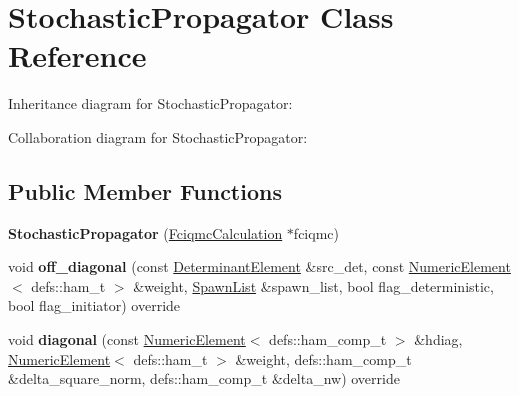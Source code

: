 \hypertarget{classStochasticPropagator}{}\section{Stochastic\+Propagator Class Reference}
\label{classStochasticPropagator}


Inheritance diagram for Stochastic\+Propagator\+:


Collaboration diagram for Stochastic\+Propagator\+:
\subsection*{Public Member Functions}
\begin{DoxyCompactItemize}
\item 
{\bfseries Stochastic\+Propagator} (\hyperlink{classFciqmcCalculation}{Fciqmc\+Calculation} $\ast$fciqmc)\hypertarget{classStochasticPropagator_a8e047b2c7790401fba3ceac809c19c45}{}\label{classStochasticPropagator_a8e047b2c7790401fba3ceac809c19c45}

\item 
void {\bfseries off\+\_\+diagonal} (const \hyperlink{classDeterminantElement}{Determinant\+Element} \&src\+\_\+det, const \hyperlink{classNumericElement}{Numeric\+Element}$<$ defs\+::ham\+\_\+t $>$ \&weight, \hyperlink{structSpawnList}{Spawn\+List} \&spawn\+\_\+list, bool flag\+\_\+deterministic, bool flag\+\_\+initiator) override\hypertarget{classStochasticPropagator_ac6e8058f872699d0960ed6264be2511e}{}\label{classStochasticPropagator_ac6e8058f872699d0960ed6264be2511e}

\item 
void {\bfseries diagonal} (const \hyperlink{classNumericElement}{Numeric\+Element}$<$ defs\+::ham\+\_\+comp\+\_\+t $>$ \&hdiag, \hyperlink{classNumericElement}{Numeric\+Element}$<$ defs\+::ham\+\_\+t $>$ \&weight, defs\+::ham\+\_\+comp\+\_\+t \&delta\+\_\+square\+\_\+norm, defs\+::ham\+\_\+comp\+\_\+t \&delta\+\_\+nw) override\hypertarget{classStochasticPropagator_a358272ef0caf2f43520dbbcacca0dbf1}{}\label{classStochasticPropagator_a358272ef0caf2f43520dbbcacca0dbf1}

\end{DoxyCompactItemize}
